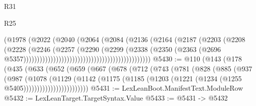 \begin{lexlean}{R31}
\begin{lexlean}{R25}
\begin{coremodule}
{{{{{{{{{{{{{{{{{{{{{{{{{{{{{{{{{{{{{{{{{{{{{{{{{{{{{{{{{{{{{{{{{{{{{{{{{{{{{{{{{{{{{{{{{{{{{{{{{{{{{{{{{{{{{{{{{{{{{{{{{{{{{{{{{{{{{{{{{{{{{{{{{{{{{{{{{{{{{{{{{{{{{{{{{{{{{{{{{{{{{{{{{{{{{{{{{{{{{{{                                                            (@1978
                                                              (@2022
                                                                (@2040
                                                                  (@2064
                                                                    (@2084
                                                                      (@2136
                                                                        (@2164
                                                                          (@2187
                                                                            (@2203
                                                                              (@2208
                                                                                (@2228
                                                                                  (@2246
                                                                                    (@2257
                                                                                      (@2290
                                                                                        (@2299
                                                                                          (@2338
                                                                                            (@2350
                                                                                              (@2363
                                                                                                (@2696
                                                                                                  @5357)))))))))))))))))))))))))))))))))))))))))))))))
@5430 := @110
    (@143
      (@178
        (@435
          (@633
            (@652
              (@659
                (@667
                  (@678
                    (@712
                      (@743
                        (@781
                          (@828
                            (@885
                              (@937
                                (@987
                                  (@1078
                                    (@1129
                                      (@1142
                                        (@1175
                                          (@1185
                                            (@1203
                                              (@1221 (@1234 (@1255 @5405))))))))))))))))))))))))
@5431 := LexLeanBoot.ManifestText.ModuleRow
@5432 := LexLeanTarget.TargetSyntax.Value
@5433 := @5431 -> @5432
}}}}}}}}}}}}}}}}}}}}}}}}}}}}}}}}}}}}}}}}}}}}}}}}}}}}}}}}}}}}}}}}}}}}}}}}}}}}}}}}}}}}}}}}}}}}}}}}}}}}}}}}}}}}}}}}}}}}}}}}}}}}}}}}}}}}}}}}}}}}}}}}}}}}}}}}}}}}}}}}}}}}}}}}}}}}}}}}}}}}}}}}}}}}}}}}}}}}}}}
\end{coremodule}
\end{lexlean}
\end{lexlean}
